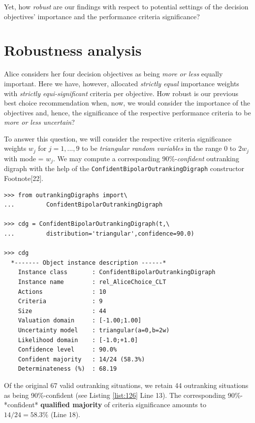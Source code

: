 Yet, how \emph{robust} are our findings with respect to potential settings of the decision objectives' importance and the performance criteria significance?
		
\section{Robustness analysis}
\label{sec:12.4}

Alice considers her four decision objectives as being \emph{more or less} equally important. Here we have, however, allocated \emph{strictly equal} importance weights with \emph{strictly equi-significant} criteria per objective. How robust is our previous best choice recommendation when, now, we would consider the importance of the objectives and, hence, the significance of the respective performance criteria to be \emph{more or less uncertain}?

To answer this question, we will consider the respective criteria significance weights $w_j$ for $j=1,...,9$ to be \emph{triangular random variables} in the range 0 to $2w_j$ with mode = $w_j$. We may compute a corresponding $90\%$-\emph{confident} outranking digraph with the help of the \texttt{ConfidentBipolarOutrankingDigraph} constructor Footnote[22].

\begin{lstlisting}[caption={Computing the 90\% confident outranking digraph},label=list:12.6]
>>> from outrankingDigraphs import\
...         ConfidentBipolarOutrankingDigraph

>>> cdg = ConfidentBipolarOutrankingDigraph(t,\
...         distribution='triangular',confidence=90.0)

>>> cdg
  *------- Object instance description ------*
    Instance class       : ConfidentBipolarOutrankingDigraph
    Instance name        : rel_AliceChoice_CLT
    Actions              : 10
    Criteria             : 9
    Size                 : 44
    Valuation domain     : [-1.00;1.00]
    Uncertainty model    : triangular(a=0,b=2w) 
    Likelihood domain    : [-1.0;+1.0] 
    Confidence level     : 90.0% 
    Confident majority   : 14/24 (58.3%) 
    Determinateness (%)  : 68.19
\end{lstlisting}

Of the original 67 valid outranking situations, we retain 44 outranking situations as being 90\%-confident (see Listing \ref{list:126} Line 13). The corresponding 90\%-*confident* \textbf{qualified majority} of criteria significance amounts to $14/24 = 58.3\%$ (Line 18).  

